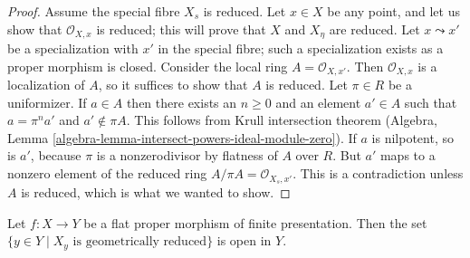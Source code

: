 \begin{proof}
Assume the special fibre $X_s$ is reduced.
Let $x \in X$ be any point, and let us show that $\mathcal{O}_{X, x}$
is reduced; this will prove that $X$ and $X_\eta$ are reduced.
Let $x \leadsto x'$ be a specialization with $x'$
in the special fibre; such a specialization exists
as a proper morphism is closed. Consider the local
ring $A = \mathcal{O}_{X, x'}$. Then $\mathcal{O}_{X, x}$
is a localization of $A$, so it suffices to show that
$A$ is reduced. Let $\pi \in R$ be a uniformizer.
If $a \in A$ then there exists an $n \geq 0$ and an element
$a' \in A$ such that $a = \pi^n a'$ and $a' \not \in \pi A$.
This follows from Krull intersection theorem
(Algebra, Lemma \ref{algebra-lemma-intersect-powers-ideal-module-zero}).
If $a$ is nilpotent, so is $a'$, because $\pi$ is a nonzerodivisor
by flatness of $A$ over $R$.
But $a'$ maps to a nonzero element of the reduced ring
$A/\pi A = \mathcal{O}_{X_s, x'}$.
This is a contradiction unless $A$ is reduced, which
is what we wanted to show.
\end{proof}

\begin{lemma}
\label{lemma-geometrically-reduced-open}
Let $f : X \to Y$ be a flat proper morphism of finite presentation.
Then the set $\{y \in Y \mid X_y\text{ is geometrically reduced}\}$
is open in $Y$.
\end{lemma}

